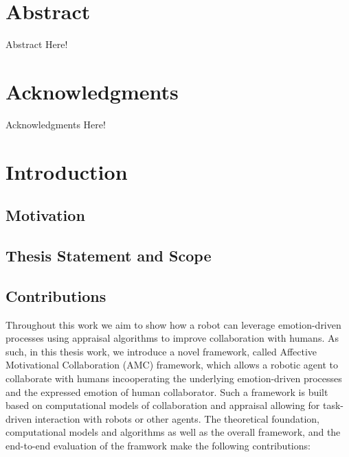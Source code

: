 \documentclass[12pt]{report}
\begin{document}

\chapter*{Abstract}

Abstract Here!

\pagebreak

\chapter*{Acknowledgments}

Acknowledgments Here!

\pagebreak

\tableofcontents
\pagebreak

\listoffigures
\pagebreak

\listoftables
\pagebreak



\chapter{Introduction}
\label{ch:introduction}

\section{Motivation}

\section{Thesis Statement and Scope}

\section{Contributions}

Throughout this work we aim to show how a robot can leverage emotion-driven
processes using appraisal algorithms to improve collaboration with humans. As
such, in this thesis work, we introduce a novel framework, called Affective
Motivational Collaboration (AMC) framework, which allows a robotic agent to
collaborate with humans incooperating the underlying emotion-driven processes
and the expressed emotion of human collaborator. Such a framework is built
based on computational models of collaboration and appraisal allowing for
task-driven interaction with robots or other agents. The theoretical foundation,
computational models and algorithms as well as the overall framework, and the
end-to-end evaluation of the framwork make the following contributions:
\end{document}
